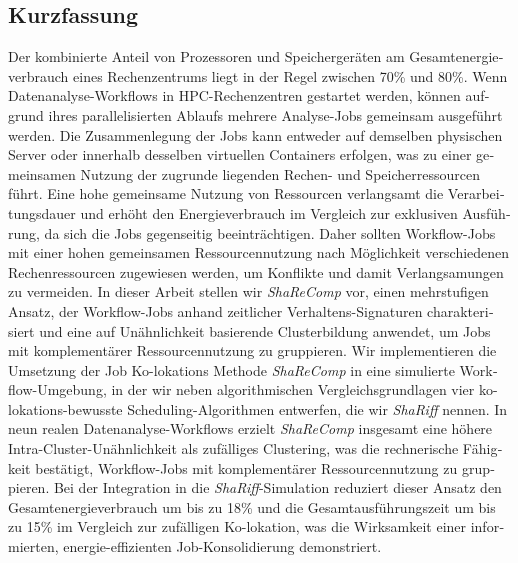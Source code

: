 \documentclass[a4paper, 11pt]{article}
\begin{document}
\clearpage
\begin{otherlanguage}{ngerman}
    \section*{Kurzfassung}
    Der kombinierte Anteil von Prozessoren und Speichergeräten am Gesamtenergieverbrauch eines Rechenzentrums liegt in der Regel zwischen 70\% und 80\%. Wenn Datenanalyse-Workflows in HPC-Rechenzentren gestartet werden, können aufgrund ihres parallelisierten Ablaufs mehrere Analyse-Jobs gemeinsam ausgeführt werden. Die Zusammenlegung der Jobs kann entweder auf demselben physischen Server oder innerhalb desselben virtuellen Containers erfolgen, was zu einer gemeinsamen Nutzung der zugrunde liegenden Rechen- und Speicherressourcen führt. Eine hohe gemeinsame Nutzung von Ressourcen verlangsamt die Verarbeitungsdauer und erhöht den Energieverbrauch im Vergleich zur exklusiven Ausführung, da sich die Jobs gegenseitig beeinträchtigen. Daher sollten Workflow-Jobs mit einer hohen gemeinsamen Ressourcennutzung nach Möglichkeit verschiedenen Rechenressourcen zugewiesen werden, um Konflikte und damit Verlangsamungen zu vermeiden. In dieser Arbeit stellen wir \textit{ShaReComp} vor, einen mehrstufigen Ansatz, der Workflow-Jobs anhand zeitlicher Verhaltens-Signaturen charakterisiert und eine auf Unähnlichkeit basierende Clusterbildung anwendet, um Jobs mit komplementärer Ressourcennutzung zu gruppieren. Wir implementieren die Umsetzung der Job Ko-lokations Methode \textit{ShaReComp} in eine simulierte Workflow-Umgebung, in der wir neben algorithmischen Vergleichsgrundlagen vier ko-lokations-bewusste Scheduling-Algorithmen entwerfen, die wir \textit{ShaRiff} nennen. In neun realen Datenanalyse-Workflows erzielt \textit{ShaReComp} insgesamt eine höhere Intra-Cluster-Unähnlichkeit als zufälliges Clustering, was die rechnerische Fähigkeit bestätigt, Workflow-Jobs mit komplementärer Ressourcennutzung zu gruppieren. Bei der Integration in die \textit{ShaRiff}-Simulation reduziert dieser Ansatz den Gesamtenergieverbrauch um bis zu 18\% und die Gesamtausführungszeit um bis zu 15\% im Vergleich zur zufälligen Ko-lokation, was die Wirksamkeit einer informierten, energie-effizienten Job-Konsolidierung demonstriert.
\end{otherlanguage}

\clearpage

\tableofcontents
\listoftables
\listoffigures
\listofalgorithms
\clearpage


\clearpage

\clearpage

\clearpage

\clearpage

\clearpage

\clearpage


\clearpage


\clearpage



\newpage
\printbibliography[heading=bibintoc,title={Bibliography}]
\end{document}
